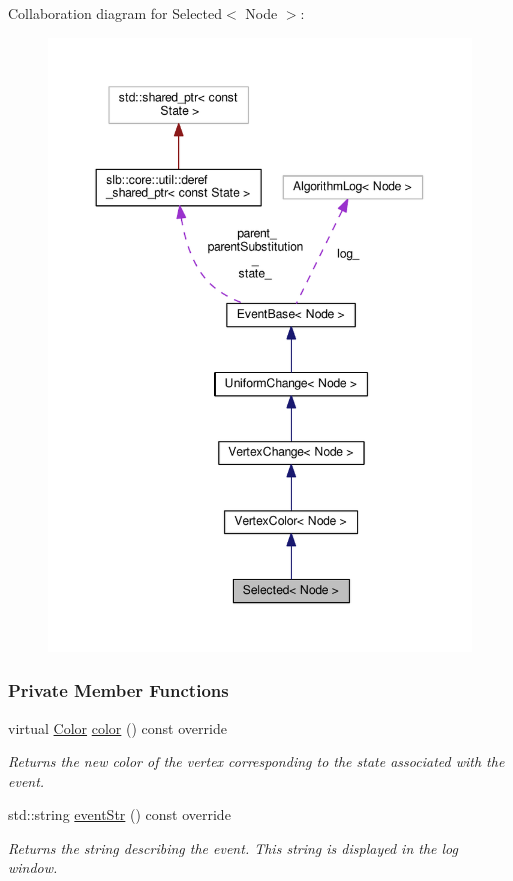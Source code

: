 Collaboration diagram for Selected$<$ Node $>$\+:\nopagebreak
\begin{figure}[H]
\begin{center}
\leavevmode
\includegraphics[width=350pt]{structSelected__coll__graph}
\end{center}
\end{figure}
\subsubsection*{Private Member Functions}
\begin{DoxyCompactItemize}
\item 
virtual \hyperlink{colors_8h_ab87bacfdad76e61b9412d7124be44c1c}{Color} \hyperlink{structSelected_a02f655f0ca3eee7b0697ad8a2bd7df2f}{color} () const override
\begin{DoxyCompactList}\small\item\em Returns the new color of the vertex corresponding to the state associated with the event. \end{DoxyCompactList}\item 
std\+::string \hyperlink{structSelected_aa8bbc5098aa494b46934fdcfbf07e9f0}{event\+Str} () const override
\begin{DoxyCompactList}\small\item\em Returns the string describing the event. This string is displayed in the log window. \end{DoxyCompactList}\end{DoxyCompactItemize}
